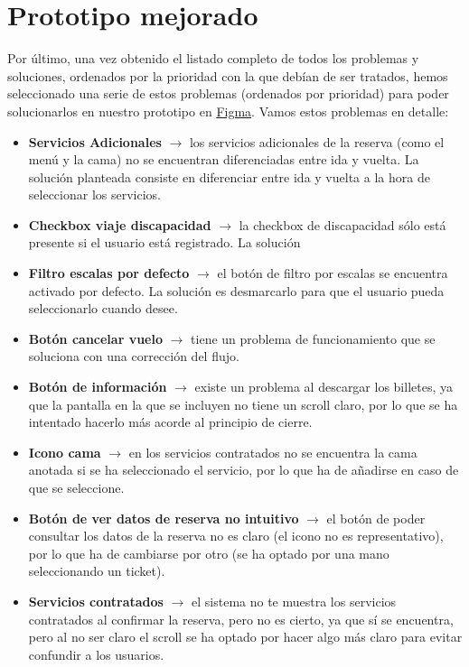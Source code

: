 \section{Prototipo mejorado}
Por último, una vez obtenido el listado completo de todos los problemas y soluciones, ordenados por la prioridad con la que debían de ser tratados, hemos seleccionado
una serie de estos problemas (ordenados por prioridad) para poder solucionarlos en nuestro prototipo en \href{https://www.figma.com/file/YGz2UUMhvxNOTCHhu1TZle/Just-Travel-It?type=design&node-id=561%3A4382&mode=design&t=TUpWh6Kqo4yieX47-1}{Figma}.
Vamos estos problemas en detalle:
\begin{itemize}
    \item \textbf{Servicios Adicionales} $\rightarrow$ los servicios adicionales de la reserva (como el menú y la cama) no se encuentran diferenciadas entre ida y vuelta. La solución planteada consiste en diferenciar entre ida y vuelta a la hora de seleccionar los servicios.
    \item \textbf{Checkbox viaje discapacidad} $\rightarrow$ la checkbox de discapacidad sólo está presente si el usuario está registrado. La solución 
    \item \textbf{Filtro escalas por defecto} $\rightarrow$ el botón de filtro por escalas se encuentra activado por defecto. La solución es desmarcarlo para que el usuario pueda seleccionarlo cuando desee.
    \item \textbf{Botón cancelar vuelo} $\rightarrow$ tiene un problema de funcionamiento que se soluciona con una corrección del flujo.
    \item \textbf{Botón de información} $\rightarrow$ existe un problema al descargar los billetes, ya que la pantalla en la que se incluyen no tiene un scroll claro, por lo que se ha intentado hacerlo más acorde al principio de cierre.
    \item \textbf{Icono cama} $\rightarrow$ en los servicios contratados no se encuentra la cama anotada si se ha seleccionado el servicio, por lo que ha de añadirse en caso de que se seleccione.
    \item \textbf{Botón de ver datos de reserva no intuitivo} $\rightarrow$ el botón de poder consultar los datos de la reserva no es claro (el icono no es representativo), por lo que ha de cambiarse por otro (se ha optado por una mano seleccionando un ticket).
    \item \textbf{Servicios contratados} $\rightarrow$ el sistema no te muestra los servicios contratados al confirmar la reserva, pero no es cierto, ya que sí se encuentra, pero al no ser claro el scroll se ha optado por hacer algo más claro para evitar confundir a los usuarios.

\end{itemize}
